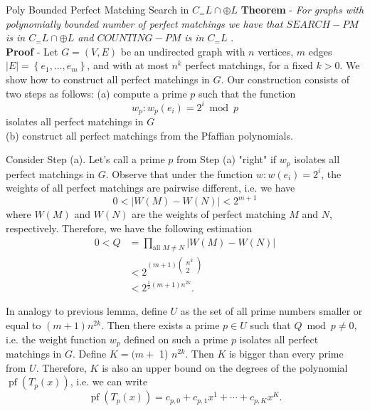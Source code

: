 \documentclass{beamer}
\begin{document}
\begin{frame}[allowframebreaks]{Poly Bounded Perfect Matching Search in $C_=L \cap \oplus L$}
	\textbf{Theorem} - \textit{For graphs with polynomially bounded number of perfect matchings we have that  $SEARCH-PM$ is in $C_=L \cap \oplus L$ and $COUNTING-PM$ is in $C_=L$} .\\
	\textbf{Proof} - Let $G=(V, E)$ be an undirected graph with $n$ vertices, $m$ edges $|E|=\left\{e_1, \ldots, e_m\right\}$, and with at most $n^k$ perfect matchings, for a fixed $k>0$. We show how to construct all perfect matchings in $G$. Our construction consists of two steps as follows:
	(a) compute a prime $p$ such that the function
	$$
	w_p: w_p\left(e_i\right)=2^i \bmod p
	$$
	isolates all perfect matchings in $G$\\
	(b) construct all perfect matchings from the Pfaffian polynomials.
	
	Consider Step (a). Let's call a prime $p$ from Step (a) "right" if $w_p$ isolates all perfect matchings in $G$. Observe that under the function $w: w\left(e_i\right)=2^i$, the weights of all perfect matchings are pairwise different, i.e. we have
	$$
	0<|W(M)-W(N)|<2^{m+1}
	$$
	where $W(M)$ and $W(N)$ are the weights of perfect matching $M$ and $N$, respectively. Therefore, we have the following estimation
	$$
	\begin{aligned}
		0<Q & =\prod_{\text {all } M \neq N}|W(M)-W(N)| \\
		& <2^{(m+1)\left(\begin{array}{c}
				n^k \\
				2
			\end{array}\right)} \\
		& <2^{\frac{1}{2}(m+1) n^{2 k}} .
	\end{aligned}
	$$
	
	In analogy to previous lemma, define $U$ as the set of all prime numbers smaller or equal to $(m+1) n^{2 k}$. Then there exists a prime $p \in U$ such that $Q \bmod p \neq 0$, i.e. the weight function $w_p$ defined on such a prime $p$ isolates all perfect matchings in $G$. Define $K=(m+$ 1) $n^{2 k}$. Then $K$ is bigger than every prime from $U$. Therefore, $K$ is also an upper bound on the degrees of the polynomial $\operatorname{pf}\left(T_p(x)\right)$, i.e. we can write
	$$
	\operatorname{pf}\left(T_p(x)\right)=c_{p, 0}+c_{p, 1} x^1+\cdots+c_{p, K} x^K .
	$$
	

\end{frame}
\end{document}

